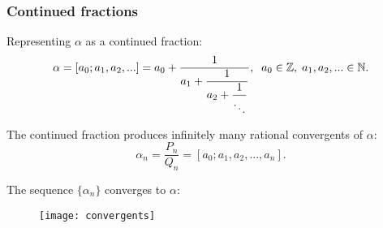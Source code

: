 \begin{frame}
\frametitle{Continued fractions}

Representing $\alpha$ as a continued fraction:
\begin{equation*}
	\alpha =
	[a_0; a_1, a_2, ...] =
	a_0 + \dfrac{1}{\normalsize a_1 + \dfrac{1}{a_2 + \dfrac{1}{\ddots}}},\;\;
	a_0 \in \mathbb{Z},\; a_1, a_2, ... \in \mathbb{N}.
\end{equation*}

The continued fraction produces infinitely many rational convergents of $\alpha$:
\begin{equation*}
	\alpha_n = \dfrac{P_n}{Q_n} = [a_0; a_1, a_2, ..., a_n].
\end{equation*}

The sequence $\{\alpha_n\}$ converges to $\alpha$:
\begin{figure}[c]
	\texttt{[image: convergents]}
\end{figure}

\end{frame}
